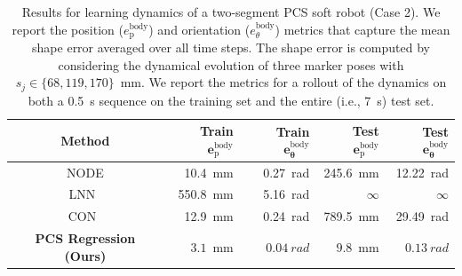 \begin{table}[htbp]
\centering
\caption{Results for learning dynamics of a two-segment PCS soft robot (Case 2). We report the position ($e_\mathrm{p}^\mathrm{body}$) and orientation ($e_\theta^\mathrm{body}$) metrics that capture the mean shape error averaged over all time steps. The shape error is computed by considering the dynamical evolution of three marker poses with $s_j \in \{ 68, 119, 170 \}$~\si{mm}. We report the metrics for a rollout of the dynamics on both a \SI{0.5}{s} sequence on the training set and the entire (i.e., \SI{7}{s}) test set.}
\label{tab:pcsregression:dynamics_pcs_ns-2_with_baselines}
\setlength\tabcolsep{3pt}
\begin{small}
\begin{tabular}{c r r r r}
    \toprule
    \textbf{Method} & \textbf{Train} $\mathbf{e_\mathrm{p}^\mathrm{body}}$ & \textbf{Train} $\mathbf{e_\theta^\mathrm{body}}$ & \textbf{Test} $\mathbf{e_\mathrm{p}^\mathrm{body}}$ & \textbf{Test} $\mathbf{e_\theta^\mathrm{body}}$\\
    \midrule
    \gls{NODE} & \SI{10.4}{mm} & \SI{0.27}{rad} & \SI{245.6}{mm} & \SI{12.22}{rad}\\
    \gls{LNN}~\citep{liu2024physics} & \SI{550.8}{mm} & \SI{5.16}{rad} & $\infty$ & $\infty$\\
    \gls{CON}~\citep{stolzle2024input} & \SI{12.9}{mm} & \SI{0.24}{rad} & \SI{789.5}{mm} & \SI{29.49}{rad}\\
    \textbf{PCS Regression (Ours)} & $\mathbf{3.1}$~\si{mm} & $\mathbf{0.04}~\si{rad}$ & $\mathbf{9.8}$~\si{mm} & $\mathbf{0.13}~\si{rad}$\\
    \bottomrule
\end{tabular}
\end{small}
\end{table}

